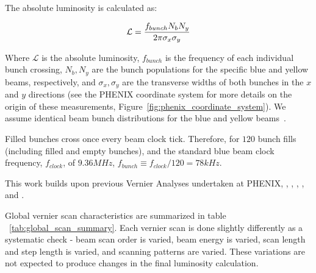 {\noindent}The absolute luminosity is calculated as:

\begin{equation} 
\label{eq:lumi_one_bunch} 
\mathcal{L} = {f_{bunch}N_{b} N_{y}\over{2\pi\sigma_{x}\sigma_{y}}} 
\end{equation}

Where $\mathcal{L}$ is the absolute luminosity, $f_{bunch}$ is the frequency of
each individual bunch crossing, $N_{b}, N_{y}$ are the bunch populations for the
specific blue and yellow beams, respectively, and $\sigma_{x}, \sigma_{y}$ are
the transverse widths of both bunches in the $x$ and $y$ directions (see the
PHENIX coordinate system for more details on the origin of these measurements,
Figure~\ref{fig:phenix_coordinate_system}). We assume identical beam bunch
distributions for the blue and yellow beams~\cite{AN888Datta2010}.

Filled bunches cross once every beam clock tick. Therefore, for $120$ bunch
fills (including filled and empty bunches), and the standard blue beam clock
frequency, $f_{clock}$, of $9.36 MHz$, $f_{bunch} \equiv f_{clock} / 120 = 78
kHz$.

This work builds upon previous Vernier Analyses undertaken at PHENIX,
\cite{AN184Belikov2003}, \cite{an597Bazilevsky2007}, \cite{an688Bennett2008},
\cite{AN888Datta2010}, and \cite{Drees2009}.

Global vernier scan characteristics are summarized in table
~\ref{tab:global_scan_summary}. Each vernier scan is done slightly differently
as a systematic check - beam scan order is varied, beam energy is varied, scan
length and step length is varied, and scanning patterns are varied. These
variations are not expected to produce changes in the final luminosity
calculation.

